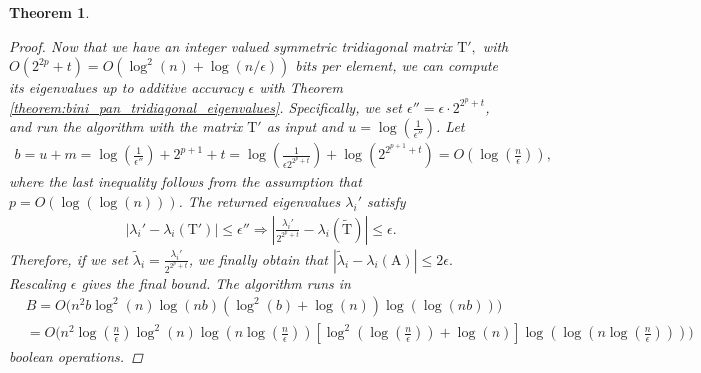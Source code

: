 \documentclass{article}
\newcommand{\labs}{\left|}
\newcommand{\rabs}{\right|}
\newcommand{\lbrac}{\left[}
\newcommand{\rbrac}{\right]}
\newcommand{\lpar}{\left(}
\newcommand{\rpar}{\right)}
\newtheorem{theorem}{Theorem}[section]
\newcommand\matA{\boldsymbol{\mathrm{A}}}
\newcommand\matT{\boldsymbol{\mathrm{T}}}
\newcommand\matTtilde{\widetilde{\boldsymbol{\mathrm{T}}}}
\begin{document}
\begin{theorem}
\begin{proof}
        Now that we have an integer valued symmetric tridiagonal matrix $\matT',$ with $O(2^{2p}+t)=O(\log^2(n)+\log(n/\epsilon))$ bits per element, we can compute its eigenvalues up to additive accuracy $\epsilon$ with Theorem \ref{theorem:bini_pan_tridiagonal_eigenvalues}. 
        Specifically, we set $\epsilon''=\epsilon\cdot 2^{2^p+t}$, and run the algorithm with the matrix $\matT'$ as input and $u=\log(\tfrac{1}{\epsilon''})$. 
        Let \begin{align*}
            b = u+m = \log\lpar\frac{1}{\epsilon''}\rpar + 2^{p+1} + t = \log\lpar
                    \frac{1}{\epsilon 2^{2^p+t}}
                \rpar + \log \lpar
                    2^{2^{p+1}+t}
                \rpar
            = 
            O(\log(\tfrac{n}{\epsilon})),
        \end{align*}
        where the last inequality follows from the assumption that $p=O(\log(\log(n)))$.
        The returned eigenvalues $\lambda_i'$ satisfy 
        \begin{align*}
        \labs
            \lambda_i'
            -
            \lambda_i(\matT')
        \rabs            
        \leq
        \epsilon''
        \Rightarrow
        \labs
            \frac{\lambda_i'}{2^{2^p+t}}
            -
            \lambda_i(\matTtilde)
        \rabs
        \leq
        \epsilon.
        \end{align*}
        Therefore, if we set $\widetilde\lambda_i=\frac{\lambda_i'}{2^{2^p+t}}$, we finally obtain that $
            \labs
                \widetilde\lambda_i
                -
                \lambda_i(\matA)
            \rabs
            \leq
            2\epsilon.$
        Rescaling $\epsilon$ gives the final bound.
        The algorithm runs in
        \begingroup
        \allowdisplaybreaks
        \begin{align*}
            &B= O\bigg(
                n^2b\log^2(n)\log(nb)(\log^2(b)+\log(n))\log(\log(nb))
            \bigg)
            \\
            &=
            O\bigg(
                n^2
                \log(\tfrac{n}{\epsilon})
                \log^2(n)
                \log(n\log(\tfrac{n}{\epsilon}))                
                \lbrac
                    \log^2(\log(\tfrac{n}{\epsilon}))
                    +
                    \log(n)
                \rbrac
                \log(\log(n\log(\tfrac{n}{\epsilon})))
            \bigg)
        \end{align*}
        \endgroup
        boolean operations.
    \end{proof}
\end{theorem}
\end{document}
